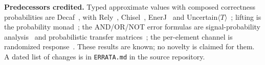 \begin{center}
{\begin{minipage}{0.93\linewidth}
\textbf{Predecessors credited.} Typed approximate values with composed correctness probabilities are Decaf~\cite{boston2015decaf}, with Rely~\cite{carbin2013rely}, Chisel~\cite{misailovic2014chisel}, EnerJ~\cite{sampson2011enerj} and Uncertain$\langle T\rangle$~\cite{bornholt2014uncertain}; lifting is the probability monad~\cite{giry1982categorical,ramsey2002stochastic}; the AND/OR/NOT error formulas are signal-probability analysis~\cite{parker1975probabilistic} and probabilistic transfer matrices~\cite{krishnaswamy2008ptm}; the per-element channel is randomized response~\cite{warner1965}. These results are known; no novelty is claimed for them.
A dated list of changes is in \texttt{ERRATA.md} in the source repository.
\end{minipage}}
\end{center}
\endgroup
